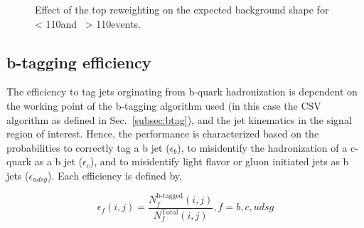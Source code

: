 \begin{figure}
  \caption{Effect of the top \pt reweighting on the expected \ttbar background \ptmiss shape for~\protect{} \mttll < 110\:\GeV\:and~\protect{} \mttll > 110\:\GeV\:events.}
  \label{fig:topPtRwgt}
\end{figure}

\subsection{b-tagging efficiency}

The efficiency to tag jets orginating from b-quark hadronization is dependent on the working point of the b-tagging algorithm used (in this case the CSV algorithm as defined in Sec.~\ref{subsec:btag}), and the jet kinematics in the signal region of interest. Hence, the performance is characterized based on the probabilities to correctly tag a b jet ($\epsilon_{b}$), to misidentify the hadronization of a c-quark as a b jet ($\epsilon_{c}$), and to misidentify light flavor or gluon initiated jets as b jets ($\epsilon_{udsg}$). Each efficiency is defined by,

\begin{equation}
  \epsilon_{f}(i,j) = \frac{N_{f}^{\text{b-tagged}}(i,j)}{N_{f}^{\text{Total}}(i,j)}, f=b,c,udsg
\end{equation}

